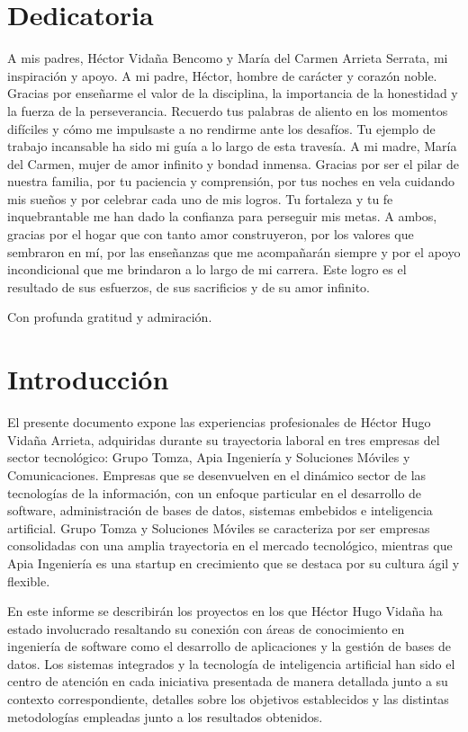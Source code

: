 \documentclass[final, fmstyle, 12pt]{article}
\begin{document}
\section{Dedicatoria}
\setlength{\parskip}{1em}
A mis padres, Héctor Vidaña Bencomo y María del Carmen Arrieta Serrata, mi inspiración y apoyo.
A mi padre, Héctor, hombre de carácter y corazón noble. Gracias por enseñarme el valor de la disciplina, la importancia de la honestidad y la fuerza de la perseverancia. Recuerdo tus palabras de aliento en los momentos difíciles y cómo me impulsaste a no rendirme ante los desafíos. Tu ejemplo de trabajo incansable ha sido mi guía a lo largo de esta travesía.
A mi madre, María del Carmen, mujer de  amor infinito y  bondad inmensa. Gracias por ser el pilar de nuestra familia, por tu paciencia y comprensión, por tus noches en vela cuidando mis sueños y por celebrar cada uno de mis logros.  Tu fortaleza y tu fe inquebrantable me han dado la confianza para perseguir mis metas.
A ambos, gracias por el hogar que con tanto amor construyeron, por los valores que sembraron en mí, por las enseñanzas que me acompañarán siempre y por el apoyo incondicional que me brindaron a lo largo de mi carrera. Este logro es el resultado de sus esfuerzos, de sus sacrificios y de su amor infinito.


Con profunda gratitud y admiración.



\newpage
\section{Introducción}
\setlength{\parskip}{1em} 
El presente documento expone las experiencias profesionales de Héctor Hugo Vidaña Arrieta, 
adquiridas durante su trayectoria laboral en tres empresas del sector tecnológico: 
Grupo Tomza, Apia Ingeniería y Soluciones Móviles y Comunicaciones. 
Empresas que se desenvuelven en el dinámico sector de las tecnologías de la información, 
con un enfoque particular en el desarrollo de software, administración de bases de datos,
sistemas embebidos e inteligencia artificial. Grupo Tomza y Soluciones Móviles se caracteriza por ser empresas consolidadas con una amplia trayectoria en el mercado tecnológico, mientras que Apia Ingeniería es una startup en crecimiento que se destaca por su cultura ágil y flexible.

En este informe se describirán los proyectos en los que Héctor Hugo Vidaña ha estado involucrado resaltando su conexión con áreas de conocimiento en ingeniería de software como el desarrollo de aplicaciones y la gestión de bases de datos.
Los sistemas integrados y la tecnología de inteligencia artificial han sido el centro de atención en cada iniciativa presentada de manera detallada junto a su contexto correspondiente, detalles sobre los objetivos establecidos y las distintas metodologías empleadas junto a los resultados obtenidos.
\end{document}
